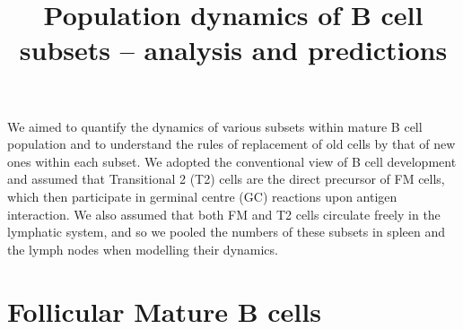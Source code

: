 \documentclass[11pt]{article}
\title{Population dynamics of  B cell subsets -- analysis and predictions}
\author{}
\date{}
\newcommand{\red}[1]{{\color{red}{#1}}}
\begin{document}
 
\maketitle

We aimed to quantify the dynamics of various subsets within mature B cell population and to understand the rules of replacement of old cells by that of new ones within each subset.  We adopted the conventional view of B cell development and assumed that Transitional 2 (T2) cells are the direct precursor of FM cells, which then participate in germinal centre (GC) reactions upon antigen interaction. We also assumed that both FM and T2 cells circulate freely in the lymphatic system, and so we pooled the numbers of these subsets in spleen and the lymph nodes when modelling their dynamics.







\section*{Follicular Mature B cells}
\end{document}
